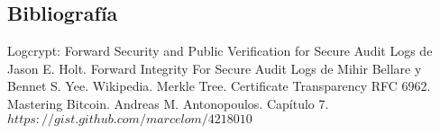 \subsection{Bibliografía}



\begin{thebibliography}{9}
Logcrypt: Forward Security and Public Verification for Secure Audit Logs de Jason E. Holt.
Forward Integrity For Secure Audit Logs de Mihir Bellare y Bennet S. Yee.
Wikipedia. Merkle Tree.
Certificate Transparency RFC 6962.
Mastering Bitcoin. Andreas M. Antonopoulos. Cap\'itulo 7.
$https://gist.github.com/marcelom/4218010$

\end{thebibliography}